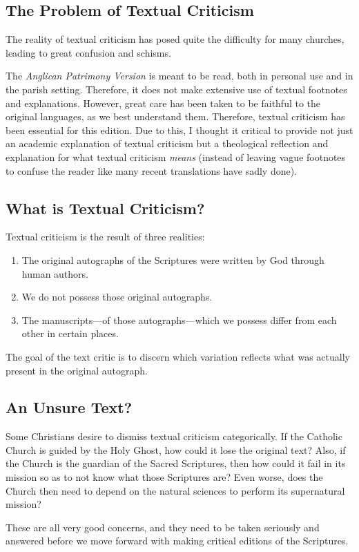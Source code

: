 \begin{onecolumn}	
\chapter{The Problem of Textual Criticism}
The reality of textual criticism has posed quite the difficulty for many churches, leading to great confusion and schisms.
\par
The \textit{Anglican Patrimony Version} is meant to be read, both in personal use and in the parish setting. Therefore, it does not make extensive use of textual footnotes and explanations. However, great care has been taken to be faithful to the original languages, as we best understand them. Therefore, textual criticism has been essential for this edition. Due to this, I thought it critical to provide not just an academic explanation of textual criticism but a theological reflection and explanation for what textual criticism \textit{means} (instead of leaving vague footnotes to confuse the reader like many recent translations have sadly done).
\section{What is Textual Criticism?}
Textual criticism is the result of three realities:
\begin{enumerate}
	\item The original autographs of the Scriptures were written by God through human authors.
	\item We do not possess those original autographs.
	\item The manuscripts---of those autographs---which we possess differ from each other in certain places.
\end{enumerate}
The goal of the text critic is to discern which variation reflects what was actually present in the original autograph.
\section{An Unsure Text?}
Some Christians desire to dismiss textual criticism categorically. If the Catholic Church is guided by the Holy Ghost, how could it lose the original text? Also, if the Church is the guardian of the Sacred Scriptures, then how could it fail in its mission so as to not know what those Scriptures are? Even worse, does the Church then need to depend on the natural sciences to perform its supernatural mission?

These are all very good concerns, and they need to be taken seriously and answered before we move forward with making critical editions of the Scriptures.

\end{onecolumn}
